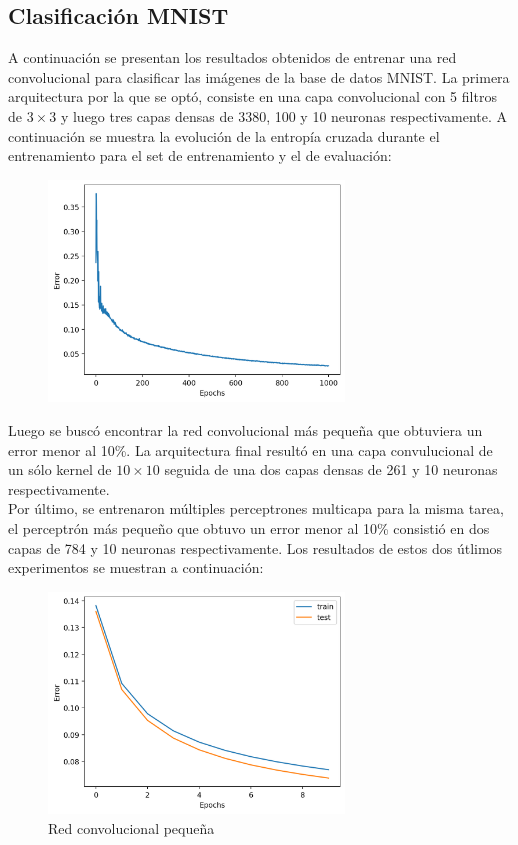\documentclass[12pt,a4paper]{article}
\begin{document}
\subsection{Clasificación MNIST}
A continuación se presentan los resultados obtenidos de entrenar una red convolucional para clasificar las imágenes de la base de datos MNIST. La primera arquitectura por la que se optó, consiste en una capa convolucional con 5 filtros de $3 \times 3$ y luego tres capas densas de 3380, 100 y 10 neuronas respectivamente. A continuación se muestra la evolución de la entropía cruzada durante el entrenamiento para el set de entrenamiento y el de evaluación:
\begin{figure}[H]
    \includegraphics[width=0.7\textwidth]{img/19-training_error.png}
    \centering
\end{figure}
Luego se buscó encontrar la red convolucional más pequeña que obtuviera un error menor al 10\%. La arquitectura final resultó en una capa convulucional de un sólo kernel de $10 \times 10$ seguida de una dos capas densas de 261 y 10 neuronas respectivamente.\\
Por último, se entrenaron múltiples perceptrones multicapa para la misma tarea, el perceptrón más pequeño que obtuvo un error menor al 10\% consistió en dos capas de 784 y 10 neuronas respectivamente. Los resultados de estos dos útlimos experimentos se muestran a continuación:
\begin{figure}[H]
    \includegraphics[width=0.7\textwidth]{img/20-training_error.png}
    \centering
    \caption*{Red convolucional pequeña}
\end{figure}
\end{document}
